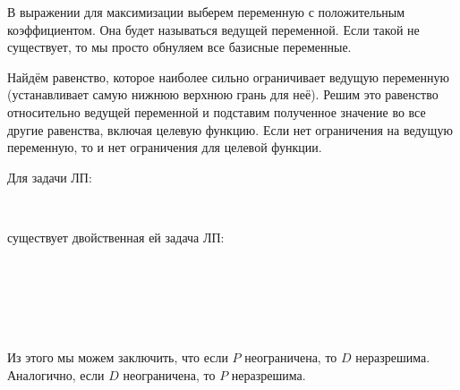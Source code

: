 
В выражении для максимизации выберем переменную с положительным коэффициентом. Она будет называться ведущей переменной. Если такой не существует, то мы просто обнуляем все базисные переменные.


Найдём равенство, которое наиболее сильно ограничивает ведущую переменную (устанавливает самую нижнюю верхнюю грань для неё). Решим это равенство относительно ведущей переменной и подставим полученное значение во все другие равенства, включая целевую функцию. Если нет ограничения на ведущую переменную, то и нет ограничения для целевой функции.


Для задачи ЛП:

\

существует двойственная ей задача ЛП:

\


\

\

Из этого мы можем заключить, что если $P$ неограничена, то $D$ неразрешима. Аналогично, если $D$ неограничена, то $P$ неразрешима. 

\




